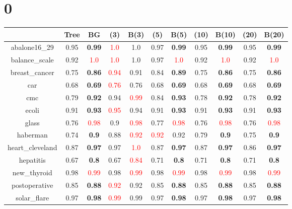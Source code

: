 \documentclass{article}%
\begin{document}
%
\normalsize%
\section*{0}%
\begin{tabular}{c|cccccccccc}%
\hline%
&Tree&BG&(3)&B(3)&(5)&B(5)&(10)&B(10)&(20)&B(20)\\%
\hline%
abalone16\_29&0.95&\textbf{0.99}&\textcolor{red}{ 
1.0
}&1.0&0.97&\textbf{0.99}&0.95&\textbf{0.99}&0.95&\textbf{0.99}\\%
\hline%
balance\_scale&0.92&\textcolor{red}{ 
1.0
}&\textcolor{red}{ 
1.0
}&1.0&0.97&\textcolor{red}{ 
1.0
}&0.92&\textcolor{red}{ 
1.0
}&0.92&\textcolor{red}{ 
1.0
}\\%
\hline%
breast\_cancer&0.75&\textbf{0.86}&\textcolor{red}{ 
0.94
}&0.91&0.84&\textbf{0.89}&0.75&\textbf{0.86}&0.75&\textbf{0.86}\\%
\hline%
car&0.68&\textbf{0.69}&\textcolor{red}{ 
0.76
}&0.76&0.68&\textbf{0.69}&0.68&\textbf{0.69}&0.68&\textbf{0.69}\\%
\hline%
cmc&0.79&\textbf{0.92}&0.94&\textcolor{red}{ 
0.99
}&0.84&\textbf{0.93}&0.78&\textbf{0.92}&0.78&\textbf{0.92}\\%
\hline%
ecoli&0.91&\textbf{0.93}&\textcolor{red}{ 
0.95
}&0.94&0.91&\textbf{0.93}&0.91&\textbf{0.93}&0.91&\textbf{0.93}\\%
\hline%
glass&0.76&\textcolor{red}{ 
0.98
}&0.9&\textcolor{red}{ 
0.98
}&0.77&\textcolor{red}{ 
0.98
}&0.76&\textcolor{red}{ 
0.98
}&0.76&\textcolor{red}{ 
0.98
}\\%
\hline%
haberman&0.74&\textbf{0.9}&0.88&\textcolor{red}{ 
0.92
}&\textcolor{red}{ 
0.92
}&0.92&0.79&\textbf{0.9}&0.75&\textbf{0.9}\\%
\hline%
heart\_cleveland&0.87&\textbf{0.97}&0.97&\textcolor{red}{ 
1.0
}&0.87&\textbf{0.97}&0.87&\textbf{0.97}&0.86&\textbf{0.97}\\%
\hline%
hepatitis&0.67&\textbf{0.8}&0.67&\textcolor{red}{ 
0.84
}&0.71&\textbf{0.8}&0.71&\textbf{0.8}&0.71&\textbf{0.8}\\%
\hline%
new\_thyroid&0.98&\textcolor{red}{ 
0.99
}&0.98&\textcolor{red}{ 
0.99
}&0.98&\textcolor{red}{ 
0.99
}&0.98&\textcolor{red}{ 
0.99
}&0.98&\textcolor{red}{ 
0.99
}\\%
\hline%
postoperative&0.85&\textbf{0.88}&\textcolor{red}{ 
0.92
}&0.92&0.85&\textbf{0.88}&0.85&\textbf{0.88}&0.85&\textbf{0.88}\\%
\hline%
solar\_flare&0.97&\textbf{0.98}&\textcolor{red}{ 
0.99
}&0.99&0.97&\textbf{0.98}&0.97&\textbf{0.98}&0.97&\textbf{0.98}\\%

\end{tabular}
\end{document}
